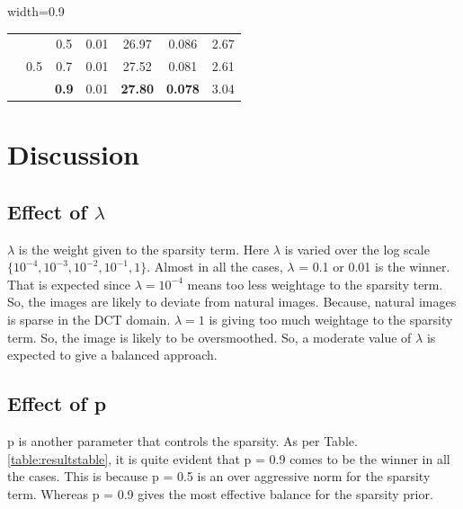 \documentclass[12pt,a4paper,onecolumn]{exam}
\begin{document}
\begin{table}[H]
\begin{adjustbox}{width=0.9\textwidth}
\begin{tabular}{|c|c|c|c|c|c|c|}
& \multirow{3}{*}{0.5} & 0.5 & 0.01 & 26.97 & 0.086 & 2.67\\ 
&                      & 0.7 & 0.01 & 27.52 & 0.081 & 2.61\\ 
&                      & \textbf{0.9} & 0.01 & \textbf{27.80} & \textbf{0.078} & 3.04 \\

\hline


\end{tabular}
\end{adjustbox}
\end{table}

\section{Discussion}
\label{section:discussion}

\subsection{Effect of \texorpdfstring{$\lambda$}{lambda}}
$\lambda$ is the weight given to the sparsity term. Here $\lambda$ is varied over the log scale $\{10^{-4},10^{-3},10^{-2},10^{-1},1\}$. Almost in all the cases, $\lambda$ = 0.1 or 0.01 is the winner. That is expected since $\lambda = 10^{-4}$ means too less weightage to the sparsity term. So, the images are likely to deviate from natural images. Because, natural images is sparse in the DCT domain. $\lambda = 1$ is giving too much weightage to the sparsity term. So, the image is likely to be oversmoothed. So, a moderate value of $\lambda$ is expected to give a balanced approach. 

\subsection{Effect of p}
p is another parameter that controls the sparsity. As per Table.\ref{table:resultstable}, it is quite evident that p = 0.9 comes to be the winner in all the cases. This is because p = 0.5 is an over aggressive norm for the sparsity term. Whereas p = 0.9 gives the most effective balance for the sparsity prior. 
\end{document}

